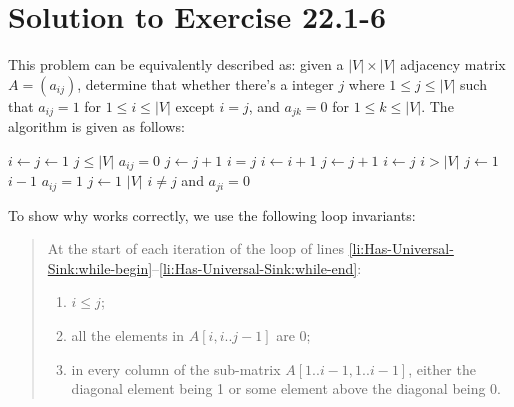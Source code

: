 \documentclass[a4paper, fleqn]{article}
\begin{document}
\section*{Solution to Exercise 22.1-6}

This problem can be equivalently described as: given a $|V| \times |V|$ adjacency matrix $A = (a_{ij})$, determine that whether there's a integer $j$ where $1 \leq j \leq |V|$ such that $a_{ij} = 1$ for $1 \leq i \leq |V|$ except $i = j$, and $a_{jk} = 0$ for $1 \leq k \leq |V|$. The algorithm is given as follows:

\begin{codebox}
\li $i \gets j \gets 1$
\li \While $j \leq |V|$  \label{li:Has-Universal-Sink:while-begin}
\li   \Do
        \If $a_{ij} = 0$
\li       \Then
            $j \gets j + 1$
\li       \Else
            \If $i = j$
\li           \Then
                $i \gets i + 1$
\li             $j \gets j + 1$
\li           \Else
                $i \gets j$
              \End
          \End
      \End    \label{li:Has-Universal-Sink:while-end}
\li \If $i > |V|$
\li   \Then
        \Return {}
\li   \Else
        \For $j \gets 1$ \To $i - 1$
\li       \Do
            \If $a_{ij} = 1$
\li           \Then
                \Return {}
              \End
          \End
\li     \For $j \gets 1$ \To $|V|$
\li       \Do
            \If $i \neq j$ and $a_{ji} = 0$
\li           \Then
                \Return {}
              \End
          \End
\li     \Return {}
      \End
\end{codebox}

To show why  works correctly, we use the following loop invariants:

\begin{quote}
At the start of each iteration of the \While loop of lines \ref{li:Has-Universal-Sink:while-begin}--\ref{li:Has-Universal-Sink:while-end}:
\begin{enumerate}
  \item $i \leq j$;

  \item all the elements in $A[i, i..j-1]$ are 0;

  \item in every column of the sub-matrix $A[1..i-1, 1..i-1]$, either the diagonal element being 1 or some element above the diagonal being 0.
\end{enumerate}
\end{quote}
\end{document}
